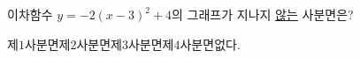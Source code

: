 이차함수 $y=-2(x-3)^2+4$의 그래프가 지나지 \underline{않는} 사분면은?
\begin{choices32}{제$1$사분면}{제$2$사분면}{제$3$사분면}{제$4$사분면}{없다.}\end{choices32}
